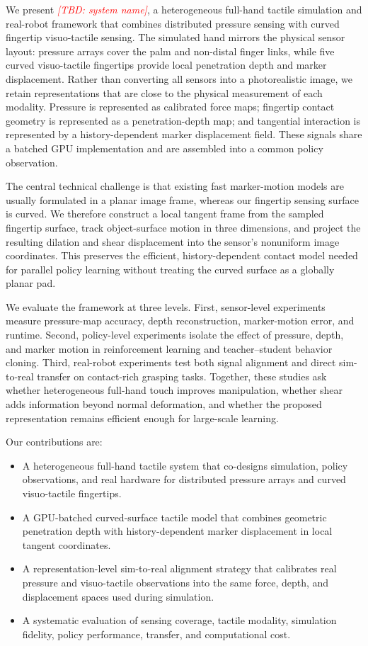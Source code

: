 \documentclass[10pt,twocolumn]{article}
\newcommand{\TBD}[1]{\textcolor{red}{[TBD: #1]}}
\begin{document}
We present \emph{\TBD{system name}}, a heterogeneous full-hand tactile
simulation and real-robot framework that combines distributed pressure sensing
with curved fingertip visuo-tactile sensing.  The simulated hand mirrors the
physical sensor layout: pressure arrays cover the palm and non-distal finger
links, while five curved visuo-tactile fingertips provide local penetration
depth and marker displacement.  Rather than converting all sensors into a
photorealistic image, we retain representations that are close to the physical
measurement of each modality.  Pressure is represented as calibrated force
maps; fingertip contact geometry is represented as a penetration-depth map; and
tangential interaction is represented by a history-dependent marker
displacement field.  These signals share a batched GPU implementation and are
assembled into a common policy observation.

The central technical challenge is that existing fast marker-motion models are
usually formulated in a planar image frame, whereas our fingertip sensing
surface is curved.  We therefore construct a local tangent frame from the
sampled fingertip surface, track object-surface motion in three dimensions, and
project the resulting dilation and shear displacement into the sensor's
nonuniform image coordinates.  This preserves the efficient, history-dependent
contact model needed for parallel policy learning without treating the curved
surface as a globally planar pad.

We evaluate the framework at three levels.  First, sensor-level experiments
measure pressure-map accuracy, depth reconstruction, marker-motion error, and
runtime.  Second, policy-level experiments isolate the effect of pressure,
depth, and marker motion in reinforcement learning and teacher--student behavior
cloning.  Third, real-robot experiments test both signal alignment and direct
sim-to-real transfer on contact-rich grasping tasks.  Together, these studies
ask whether heterogeneous full-hand touch improves manipulation, whether shear
adds information beyond normal deformation, and whether the proposed
representation remains efficient enough for large-scale learning.

Our contributions are:
\begin{itemize}
    \item A heterogeneous full-hand tactile system that co-designs simulation,
    policy observations, and real hardware for distributed pressure arrays and
    curved visuo-tactile fingertips.
    \item A GPU-batched curved-surface tactile model that combines geometric
    penetration depth with history-dependent marker displacement in local
    tangent coordinates.
    \item A representation-level sim-to-real alignment strategy that calibrates
    real pressure and visuo-tactile observations into the same force, depth,
    and displacement spaces used during simulation.
    \item A systematic evaluation of sensing coverage, tactile modality,
    simulation fidelity, policy performance, transfer, and computational cost.
\end{itemize}
\end{document}
